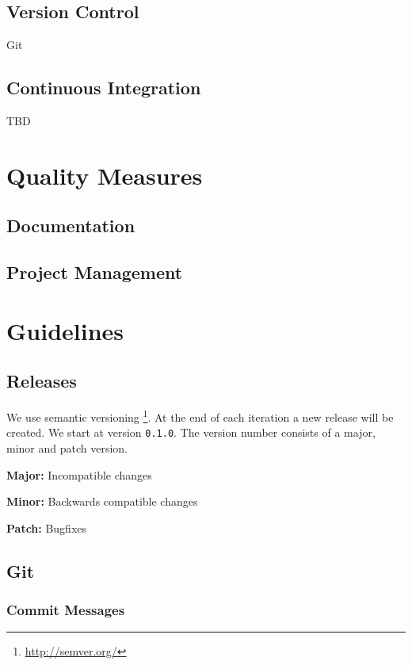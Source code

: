 \subsection{Version Control}\label{version-control}

Git

\subsection{Continuous Integration}\label{continuous-integration}

TBD

\section{Quality Measures}\label{quality-measures}

\subsection{Documentation}\label{documentation}

\subsection{Project Management}\label{project-management-2}

\section{Guidelines}\label{guidelines}

\subsection{Releases}\label{releases}

We use semantic versioning \footnote{\url{http://semver.org/}}. At the
end of each iteration a new release will be created. We start at version
\texttt{0.1.0}. The version number consists of a major, minor and patch
version.

\textbf{Major: }Incompatible changes

\textbf{Minor: }Backwards compatible changes

\textbf{Patch: }Bugfixes

\subsection{Git}\label{git}

\subsubsection{Commit Messages}\label{commit-messages}


